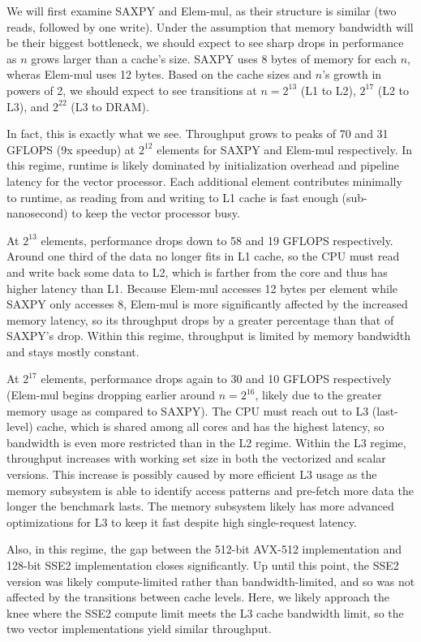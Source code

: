 \documentclass[12pt]{article}
\begin{document}
We will first examine SAXPY and Elem-mul, as their structure is similar (two
reads, followed by one write). Under the assumption that memory bandwidth will
be their biggest bottleneck, we should expect to see sharp drops in performance
as $n$ grows larger than a cache's size. SAXPY uses 8 bytes of memory for each
$n$, wheras Elem-mul uses 12 bytes. Based on the cache sizes and $n$'s growth
in powers of 2, we should expect to see transitions at $n = 2^{13}$ (L1 to L2),
$2^{17}$ (L2 to L3), and $2^{22}$ (L3 to DRAM).

In fact, this is exactly what we see. Throughput grows to peaks of 70 and 31
GFLOPS (9x speedup) at $2^{12}$ elements for SAXPY and Elem-mul respectively.
In this regime, runtime is likely dominated by initialization overhead and
pipeline latency for the vector processor. Each additional element contributes
minimally to runtime, as reading from and writing to L1 cache is fast enough
(sub-nanosecond) to keep the vector processor busy.

At $2^{13}$ elements, performance drops down to 58 and 19 GFLOPS respectively.
Around one third of the data no longer fits in L1 cache, so the CPU must read
and write back some data to L2, which is farther from the core and thus has
higher latency than L1. Because Elem-mul accesses 12 bytes per element while
SAXPY only accesses 8, Elem-mul is more significantly affected by the increased
memory latency, so its throughput drops by a greater percentage than that of
SAXPY's drop. Within this regime, throughput is limited by memory bandwidth and
stays mostly constant.

At $2^{17}$ elements, performance drops again to 30 and 10 GFLOPS respectively
(Elem-mul begins dropping earlier around $n=2^{16}$, likely due to the greater
memory usage as compared to SAXPY). The CPU must reach out to L3 (last-level)
cache, which is shared among all cores and has the highest latency, so
bandwidth is even more restricted than in the L2 regime. Within the L3 regime,
throughput increases with working set size in both the vectorized and scalar
versions. This increase is possibly caused by more efficient L3 usage as the
memory subsystem is able to identify access patterns and pre-fetch more data
the longer the benchmark lasts. The memory subsystem likely has more advanced
optimizations for L3 to keep it fast despite high single-request latency.

Also, in this regime, the gap between the 512-bit AVX-512 implementation and
128-bit SSE2 implementation closes significantly. Up until this point, the SSE2
version was likely compute-limited rather than bandwidth-limited, and so was
not affected by the transitions between cache levels. Here, we likely approach
the knee where the SSE2 compute limit meets the L3 cache bandwidth limit, so
the two vector implementations yield similar throughput.
\end{document}
